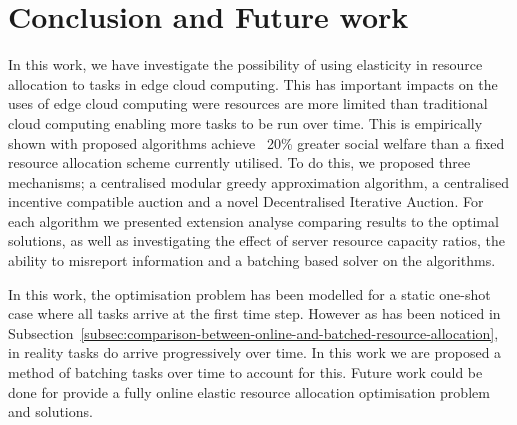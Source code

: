 \section{Conclusion and Future work}
\label{sec:conclusion-and-future-work}
In this work, we have investigate the possibility of using elasticity in resource allocation to tasks in 
edge cloud computing. This has important impacts on the uses of edge cloud computing were resources are more 
limited than traditional cloud computing enabling more tasks to be run over time. This is empirically shown 
with proposed algorithms achieve ~20\% greater social welfare than a fixed resource allocation scheme currently
utilised. To do this, we proposed three mechanisms; a centralised modular greedy approximation algorithm,
a centralised incentive compatible auction and a novel Decentralised Iterative Auction.
For each algorithm we presented extension analyse comparing results to the optimal solutions, as well as
investigating the effect of server resource capacity ratios, the ability to misreport information and a
batching based solver on the algorithms. 

In this work, the optimisation problem has been modelled for a static one-shot case where all tasks arrive at
the first time step. However as has been noticed in Subsection~\ref{subsec:comparison-between-online-and-batched-resource-allocation},
in reality tasks do arrive progressively over time. In this work we are proposed a method of batching tasks
over time to account for this. Future work could be done for provide a fully online elastic
resource allocation optimisation problem and solutions. 